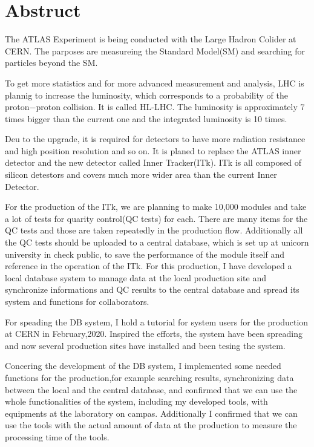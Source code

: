 \chapter*{Abstruct}

The ATLAS Experiment is being conducted with the Large Hadron Colider at CERN. The parposes are measureing the Standard Model(SM) and searching for particles beyond the SM.

To get more statistics and for more advanced measurement and analysis, LHC is plannig to increase the luminosity, which corresponds to a probability of the proton$-$proton collision. It is called HL-LHC.
The luminosity is approximately 7 times bigger than the current one and the integrated luminosity is 10 times.

Deu to the upgrade, it is required for detectors to have more radiation resistance and high position resolution and so on. 
It is planed to replace the ATLAS inner detector and the new detector called Inner Tracker(ITk). 
ITk is all composed of silicon detestors and covers much more wider area than the current Inner Detector.

For the production of the ITk, we are planning to make 10,000 modules and take a lot of tests for quarity control(QC tests) for each. 
There are many items for the QC tests and those are taken repeatedly in the production flow.
Additionally all the QC tests should be uploaded to a central database, which is set up at unicorn university in check public, to save the performance of the module itself and reference in the operation of the ITk. 
For this production, I have developed a local database system to manage data at the local production site and synchronize informations and QC results to the central database and spread its system and functions for collaborators.

For speading the DB system, I hold a tutorial for system users for the production at CERN in February,2020. Inspired the efforts, the system have been spreading and now several production sites have installed and been tesing the system.

Concering the development of the DB system, I implemented some needed functions for the production,for example searching results, synchronizing data between the local and the central database, and confirmed that we can use the whole functionalities of the system, including my developed tools, with equipments at the laboratory on campas. 
Additionally I confirmed that we can use the tools with the actual amount of data at the production to measure the processing time of the tools.

